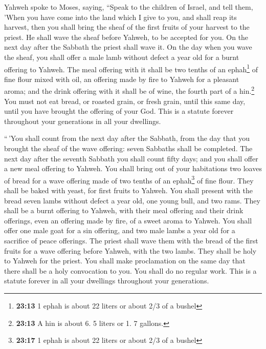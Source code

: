 Yahweh spoke to Moses, saying,  ``Speak to
the children of Israel, and tell them, 'When you have come into the land
which I give to you, and shall reap its harvest, then you shall bring
the sheaf of the first fruits of your harvest to the priest.
 He shall wave the sheaf before Yahweh, to be accepted
for you. On the next day after the Sabbath the priest shall wave it.
 On the day when you wave the sheaf, you shall offer a
male lamb without defect a year old for a burnt offering to Yahweh.
 The meal offering with it shall be two tenths of an
ephah\footnote{\textbf{23:13} 1 ephah is about 22 liters or about 2/3 of
  a bushel} of fine flour mixed with oil, an offering made by fire to
Yahweh for a pleasant aroma; and the drink offering with it shall be of
wine, the fourth part of a hin.\footnote{\textbf{23:13} A hin is about
  6. 5 liters or 1. 7 gallons.}  You must not eat bread,
or roasted grain, or fresh grain, until this same day, until you have
brought the offering of your God. This is a statute forever throughout
your generations in all your dwellings.

 ``\,'You shall count from the next day after the
Sabbath, from the day that you brought the sheaf of the wave offering:
seven Sabbaths shall be completed.  The next day after
the seventh Sabbath you shall count fifty days; and you shall offer a
new meal offering to Yahweh.  You shall bring out of your
habitations two loaves of bread for a wave offering made of two tenths
of an ephah\footnote{\textbf{23:17} 1 ephah is about 22 liters or about
  2/3 of a bushel} of fine flour. They shall be baked with yeast, for
first fruits to Yahweh.  You shall present with the bread
seven lambs without defect a year old, one young bull, and two rams.
They shall be a burnt offering to Yahweh, with their meal offering and
their drink offerings, even an offering made by fire, of a sweet aroma
to Yahweh.  You shall offer one male goat for a sin
offering, and two male lambs a year old for a sacrifice of peace
offerings.  The priest shall wave them with the bread of
the first fruits for a wave offering before Yahweh, with the two lambs.
They shall be holy to Yahweh for the priest.  You shall
make proclamation on the same day that there shall be a holy convocation
to you. You shall do no regular work. This is a statute forever in all
your dwellings throughout your generations.

